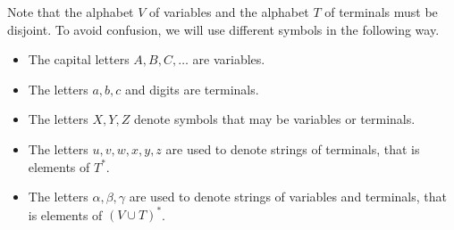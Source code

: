 

\setcounter{section}{5}
\setcounter{subsection}{1}
\setcounter{dfn}{2}


Note that the alphabet $V$ of variables and the alphabet $T$ of terminals must be disjoint.
To avoid confusion, we will use different symbols in the following way.
\begin{itemize}
\item
The capital letters $A, B, C, \ldots$ are variables.
\item
The letters $a, b, c$ and digits are terminals.
\item
The letters $X, Y, Z$ denote symbols that may be variables or terminals.
\item
The letters $u, v, w, x, y, z$ are used to denote strings of terminals, that is elements of $T^*$.
\item
The letters $\alpha, \beta, \gamma$ are used to denote strings of variables and terminals, that is elements of $(V \cup T)^*$.
\end{itemize}


